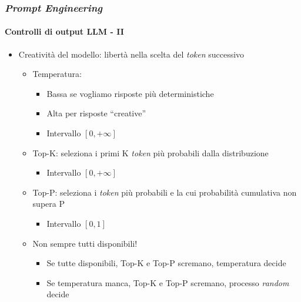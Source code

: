 \begin{frame}[t] \frametitle{\emph{Prompt Engineering}}
\framesubtitle{Controlli di output LLM - II}
{\footnotesize
    \begin{minipage}[t]{\textwidth}
        \begin{itemize}[leftmargin=10pt,align=right]
            \item[\alertedcircled{2}] \alert{Creatività del modello:} libertà nella scelta del \emph{token} successivo
            \begin{itemize}[leftmargin=10pt,align=right]
                \item[\alert{\faArrowCircleRight}] \alert{Temperatura:}
                \begin{itemize}[leftmargin=10pt,align=right]
                    \item[\alert{\faArrowCircleRight}] \alert{Bassa} se vogliamo risposte più deterministiche
                    \item[\alert{\faArrowCircleRight}] \alert{Alta} per risposte ``creative''
                    \item[\alert{\faExclamationTriangle}] Intervallo $[0, +\infty]$
                \end{itemize}
                \item[\alert{\faArrowCircleRight}] \alert{Top-K:} seleziona i primi K \textit{token} più probabili dalla distribuzione
                 \begin{itemize}[leftmargin=10pt,align=right]
                    \item[\alert{\faExclamationTriangle}] Intervallo $[0, +\infty]$
                \end{itemize}               
                \item[\alert{\faArrowCircleRight}] \alert{Top-P:} seleziona i \textit{token} più probabili e la cui probabilità cumulativa non supera P
                  \begin{itemize}[leftmargin=10pt,align=right]
                    \item[\alert{\faExclamationTriangle}] Intervallo $[0, 1]$
                \end{itemize}                    
                \item[\alert{\faExclamationTriangle}] Non sempre tutti disponibili!
                \begin{itemize}[leftmargin=10pt,align=right]
                    \item[\alert{\faArrowCircleRight}] Se tutte disponibili, Top-K e Top-P scremano, temperatura decide
                    \item[\alert{\faArrowCircleRight}] Se temperatura manca, Top-K e Top-P scremano, processo \textit{random} decide
                \end{itemize}
            \end{itemize}
        \end{itemize}
    \end{minipage}
}
\end{frame}
